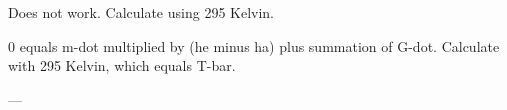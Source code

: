 Does not work.  
Calculate using 295 Kelvin.  

0 equals m-dot multiplied by (he minus ha) plus summation of G-dot.  
Calculate with 295 Kelvin, which equals T-bar.  

---